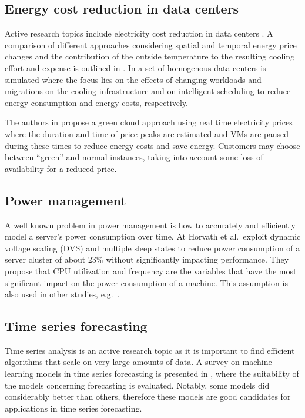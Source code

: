 \subsection{Energy cost reduction in data centers}

Active research topics include electricity cost reduction in data centers \cite{guler2013cutting, le2011reducing}. A comparison of different approaches considering spatial and temporal energy price changes and the contribution of the outside temperature to the resulting cooling effort and expense is outlined in \cite{guler2013cutting}. In \cite{le2011reducing} a set of homogenous data centers is simulated where the focus lies on the effects of changing workloads and migrations on the cooling infrastructure and on intelligent scheduling to reduce energy consumption and energy costs, respectively. 

The authors in \cite{lucanin2013take} propose a green cloud approach using real time electricity prices where the duration and time of price peaks are estimated and VMs are paused during these times to reduce energy costs and save energy. Customers may choose between ``green'' and normal instances, taking into account some loss of availability for a reduced price. 


\subsection{Power management}

A well known problem in power management is how to accurately and efficiently model a server's power consumption over time. At \cite{horvath2008multi} Horvath et al.~exploit dynamic voltage scaling (DVS) and multiple sleep states to reduce power consumption of a server cluster of about 23\% without significantly impacting performance. They propose that CPU utilization and frequency are the variables that have the most significant impact on the power consumption of a machine. This assumption is also used in other studies, e.g.~\cite{rao2010minimizing, hammadi2014survey, kliazovich2012greencloud}. 

\subsection{Time series forecasting}

Time series analysis is an active research topic as it is important to find efficient algorithms that scale on very large amounts of data. A survey on machine learning models in time series forecasting is presented in \cite{ahmed2010empirical}, where the suitability of the models concerning forecasting is evaluated. Notably, some models did considerably better than others, therefore these models are good candidates for applications in time series forecasting. 

